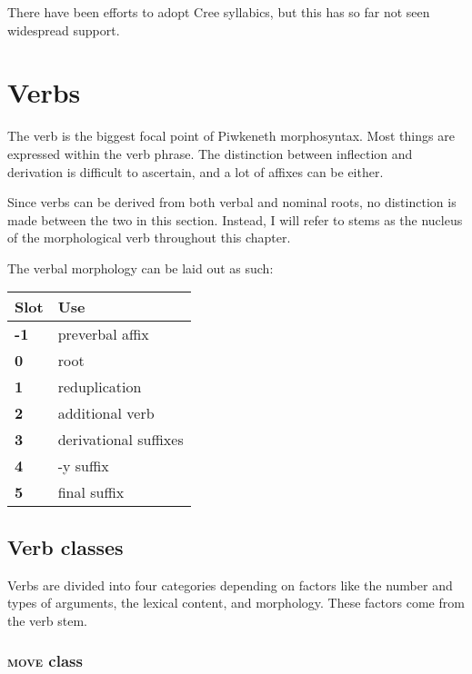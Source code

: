 \documentclass[smallroyalvopaper,9pt]{memoir}
\newcommand{\lang}{Piwkeneth}
\begin{document}
There have been efforts to adopt Cree syllabics, but this has so far not seen widespread support.

\chapter{Verbs} 


The verb is the biggest focal point of \lang{} morphosyntax. Most things are expressed within the verb phrase. The distinction between inflection and derivation is difficult to ascertain, and a lot of affixes can be either.

Since verbs can be derived from both verbal and nominal roots, no distinction is made between the two in this section. Instead, I will refer to stems as the nucleus of the morphological verb throughout this chapter.

The verbal morphology can be laid out as such:

\begin{table}[ht]
    \centering
    \begin{tabular}{>{\bfseries}ll}
        \toprule
        Slot & Use \\
        \midrule
        -1 & preverbal affix \\
        0 & root \\
        1 & reduplication \\
        2 & additional verb \\
        3 & derivational suffixes \\
        4 & -y suffix \\
        5 & final suffix \\
        \bottomrule
    \end{tabular}
\end{table}

\section{Verb classes}

Verbs are divided into four categories depending on factors like the number and types of arguments, the lexical content, and morphology. These factors come from the verb stem.

\subsection{\textsc{move} class}
\end{document}
